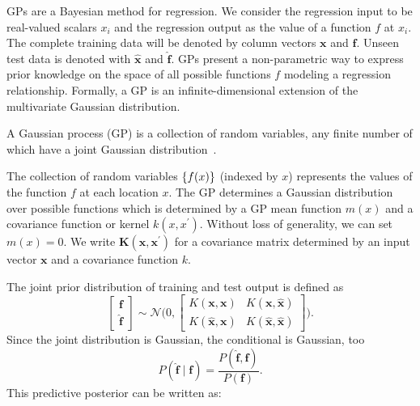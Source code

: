 \ac{GP}s are a Bayesian method for regression. We consider the regression input to be real-valued scalars $x_i$ and the regression output as the value of a function $f$ at $x_i$. The complete training data will be denoted by column vectors $\mathbf{x}$ and $\mathbf{f}$. Unseen test data is denoted with $\mathbf{\hat{x}}$ and $\mathbf{\hat{f}}$.
\ac{GP}s present a non-parametric way to express prior knowledge on the space of all possible functions $f$ modeling
a regression relationship.
Formally, a GP is an infinite-dimensional extension of the multivariate Gaussian distribution.
\begin{definition}
A Gaussian process (GP) is a collection of random variables, any
finite number of which have a joint Gaussian distribution~\citep[][chapter 2]{rasmussen2006gaussian}.
\end{definition}
The collection of random variables $\left\{ f(x) \right\}$ (indexed by $x$) represents the
values of the function $f$ at each location $x$.
The \ac{GP} determines a Gaussian distribution over possible functions 
which is determined by a \ac{GP} mean function $m(x)$ and a covariance function or kernel $k(x,x^\prime)$.
Without loss of generality, we can set $m(x)=0$. We write $\mathbf{K}(\mathbf{x},\mathbf{x}^\prime)$
for a covariance matrix determined by an input vector $\mathbf{x}$ and a covariance function $k$.
 


The joint prior distribution of training and test output is defined as 
\begin{equation}
\begin{bmatrix}
\mathbf{f} \\ 
\mathbf{\hat{f}}
\end{bmatrix}
\sim \mathcal{N}\bigg(
0,
\begin{bmatrix}
K(\mathbf{x},\mathbf{x})& K(\mathbf{x},\mathbf{\hat{x}})\\ 
K(\mathbf{\hat{x}},\mathbf{x})& K(\mathbf{\hat{x}},\mathbf{\hat{x}})
\end{bmatrix}
\bigg).
\end{equation}
Since the joint distribution is Gaussian, the conditional is Gaussian, too
\begin{equation}
\label{eq:simple_posterior}
P(\hat{\mathbf{f}} \mid \mathbf{f})  = \frac{P(\hat{\mathbf{f}}, \mathbf{f}) }{P(\mathbf{f})}.
\end{equation}
This predictive posterior can be written as:

